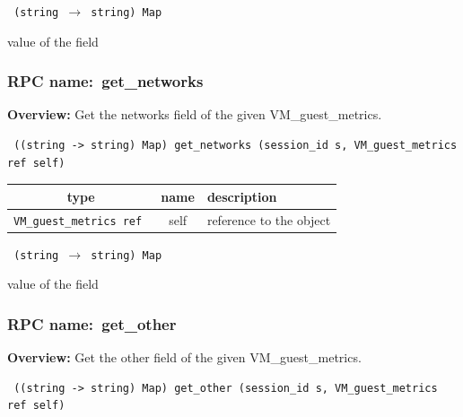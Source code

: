 \vspace{0.3cm}

{\tt 
(string $\rightarrow$ string) Map
}


value of the field
\vspace{0.3cm}
\vspace{0.3cm}
\vspace{0.3cm}
\subsubsection{RPC name:~get\_networks}

{\bf Overview:} 
Get the networks field of the given VM\_guest\_metrics.

\begin{verbatim} ((string -> string) Map) get_networks (session_id s, VM_guest_metrics ref self)\end{verbatim}



 
\vspace{0.3cm}
\begin{tabular}{|c|c|p{7cm}|}
 \hline
{\bf type} & {\bf name} & {\bf description} \\ \hline
{\tt VM\_guest\_metrics ref } & self & reference to the object \\ \hline 

\end{tabular}

\vspace{0.3cm}

{\tt 
(string $\rightarrow$ string) Map
}


value of the field
\vspace{0.3cm}
\vspace{0.3cm}
\vspace{0.3cm}
\subsubsection{RPC name:~get\_other}

{\bf Overview:} 
Get the other field of the given VM\_guest\_metrics.

\begin{verbatim} ((string -> string) Map) get_other (session_id s, VM_guest_metrics ref self)\end{verbatim}



